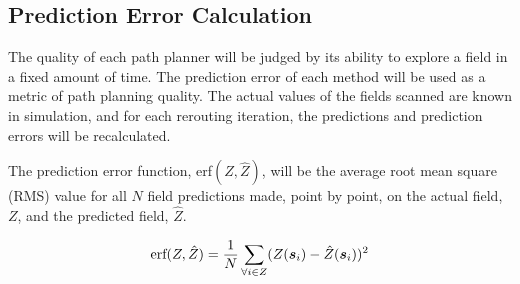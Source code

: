 \subsection{Prediction Error Calculation}
The quality of each path planner will be judged by its ability to explore a field in a fixed amount of time. The prediction error of each method will be used as a metric of path planning quality. The actual values of the fields scanned are known in simulation, and for each rerouting iteration, the predictions and prediction errors will be recalculated.

The prediction error function, erf$(Z,\hat{Z})$, will be the average root mean square (RMS) value for all $N$ field predictions made, point by point, on the actual field, $Z$, and the predicted field, $\hat{Z}$.

\begin{equation}
\text{erf}(Z, \hat{Z}) = \frac{1}{N}\sum_{\forall i \in Z} (Z({\it{\boldsymbol{s}}}_i) - \hat{Z}({\it{\boldsymbol{s}}}_i))^2
\end{equation}



